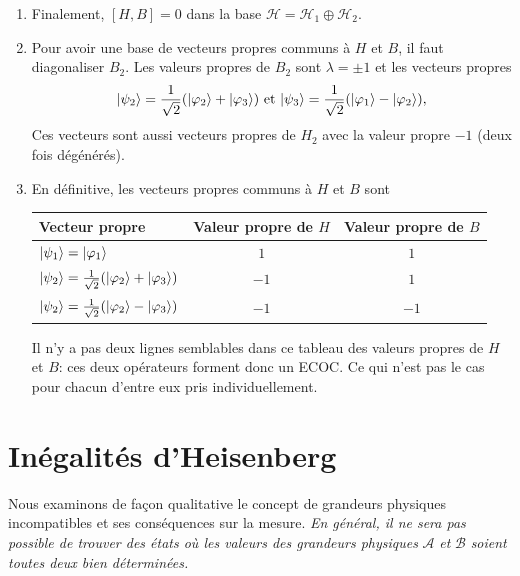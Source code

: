 \begin{example}
\begin{enumerate}
\begin{enumerate}
\item Finalement, $[H,B]=0$ dans la base $\mathcal{H} =\mathcal{H}_1\oplus
\mathcal{H}_{2}$.

\item Pour avoir une base de vecteurs propres communs à $H$ et $B$, il faut
diagonaliser $B_{2}$. Les valeurs propres de $B_{2}$ sont $\lambda=\pm1$ et
les vecteurs propres%
\begin{equation}
\vert\psi_{2}\rangle =\frac{1}{\sqrt{2}}(\vert\varphi_{2}\rangle +\vert\varphi_3\rangle)  \text{
et }\vert\psi_3\rangle =\frac{1}{\sqrt{2}}(\vert\varphi_1\rangle -\vert\varphi_{2}\rangle),
\end{equation}
Ces vecteurs sont aussi vecteurs propres de $H_{2}$ avec la valeur propre $-1$
(deux fois dégénérés).

\item En définitive, les vecteurs propres communs à $H$ et $B$ sont%
\begin{center}%
\begin{tabular}
[c]{|l|l|l|}\hline
\textbf{\textbf{Vecteur propre}} & \textbf{Valeur propre de }$H$ &
\textbf{Valeur
propre de} $B$\\\hline
$\vert\psi_1\rangle =\vert\varphi_1\rangle $ &
\multicolumn{1}{|c|}{$1$} &
\multicolumn{1}{|c|}{$1$}\\\hline
$\vert\psi_{2}\rangle =\frac{1}{\sqrt{2}}(\vert\varphi_{2}\rangle+\vert\varphi_3\rangle)$ &
\multicolumn{1}{|c|}{$-1$} & \multicolumn{1}{|c|}{$1$}\\\hline
$\vert\psi_{2}\rangle =\frac{1}{\sqrt{2}}(\vert\varphi_{2}\rangle-\vert\varphi_3\rangle)$ &
\multicolumn{1}{|c|}{$-1$} & \multicolumn{1}{|c|}{$-1$}\\\hline
\end{tabular}%
\end{center}%

Il n'y a pas deux lignes semblables dans ce tableau des valeurs propres de $H$
et $B$: ces deux opérateurs forment donc un ECOC. Ce qui n'est pas le cas pour
chacun d'entre eux pris individuellement.
\end{enumerate}
\end{enumerate}
\end{example}


\section{Inégalités d'Heisenberg}
\label{sec:InegHeis}

Nous examinons de façon qualitative le concept de grandeurs physiques
incompatibles et ses conséquences sur la mesure. \emph{En général, il ne sera
pas possible de trouver des états où les valeurs des grandeurs physiques
}$\mathcal{A}$\emph{ et }$\mathcal{B}$\emph{ soient toutes deux bien
déterminées.}

